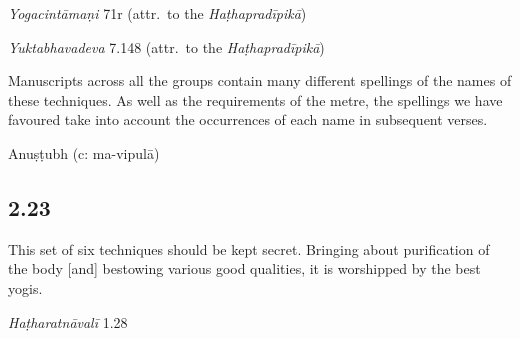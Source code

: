 \begin{ekdosis}
\begin{testimonia}[hp02_022]
\emph{Yogacintāmaṇi} 71r (attr.~to the \emph{Haṭhapradīpikā})

\begin{versinnote}
\end{versinnote}

\emph{Yuktabhavadeva} 7.148 (attr.~to the \emph{Haṭhapradīpikā})

\begin{versinnote}
\end{versinnote}

\end{testimonia}

\begin{philcomm}[hp02_022]
Manuscripts across all the groups contain many different spellings of the names of these techniques. As well as the requirements of the metre, the spellings we have favoured take into account the occurrences of each name in subsequent verses. 
\end{philcomm}

\begin{metre}[hp02_022]
Anuṣṭubh (c: ma-vipulā)
\end{metre}

\subsection*{2.23}
\begin{translation}[hp02_023]
This set of six techniques should be kept secret. Bringing about purification of the body [and] bestowing various good qualities, it is worshipped by the best yogis.
\end{translation}

\begin{sources}[hp02_023]
\end{sources}

\begin{testimonia}[hp02_023]
\emph{Haṭharatnāvalī} 1.28

\begin{versinnote}
\end{versinnote}


\end{testimonia}
\end{ekdosis}
